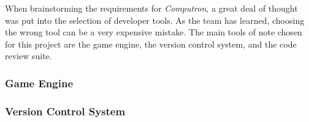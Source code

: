 When brainstorming the requirements for \textit{Computron}, a great deal of thought was put into the selection of developer tools. As the team has learned, choosing the wrong tool can be a very expensive mistake. The main tools of note chosen for this project are the game engine, the version control system, and the code review suite.

\subsubsection{Game Engine} \label{game_engine}


\subsubsection{Version Control System}


